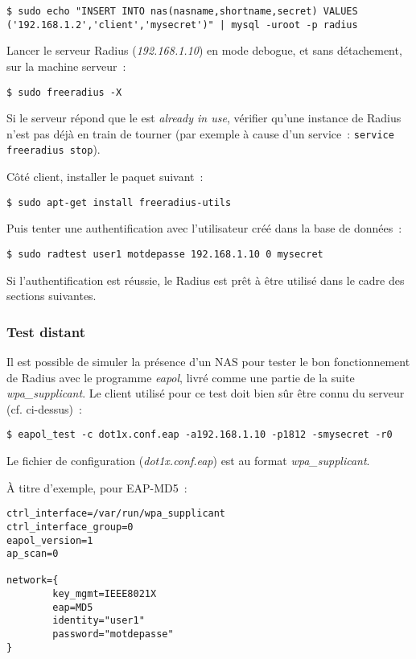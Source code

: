 \begin{lstlisting}
$ sudo echo "INSERT INTO nas(nasname,shortname,secret) VALUES ('192.168.1.2','client','mysecret')" | mysql -uroot -p radius
\end{lstlisting}

Lancer le serveur Radius (\emph{192.168.1.10}) en mode debogue, et sans détachement, sur la machine serveur~:

\begin{lstlisting}
$ sudo freeradius -X
\end{lstlisting}

Si le serveur répond que le est \emph{already in use}, vérifier qu'une instance de Radius n'est pas déjà en train de tourner (par exemple à cause d'un service~: \texttt{service freeradius stop}).

Côté client, installer le paquet suivant~:

\begin{lstlisting}
$ sudo apt-get install freeradius-utils
\end{lstlisting}

Puis tenter une authentification avec l'utilisateur créé dans la base de données~:

\begin{lstlisting}
$ sudo radtest user1 motdepasse 192.168.1.10 0 mysecret
\end{lstlisting}

Si l'authentification est réussie, le Radius est prêt à être utilisé dans le cadre des sections suivantes.

\subsubsection{Test distant}

Il est possible de simuler la présence d'un NAS pour tester le bon fonctionnement de Radius avec le programme \emph{eapol}, livré comme une partie de la suite \emph{wpa\_supplicant}. Le client utilisé pour ce test doit bien sûr être connu du serveur (cf. ci-dessus)~:

\begin{lstlisting}
$ eapol_test -c dot1x.conf.eap -a192.168.1.10 -p1812 -smysecret -r0
\end{lstlisting} 

Le fichier de configuration (\emph{dot1x.conf.eap}) est au format \emph{wpa\_supplicant}.

À titre d'exemple, pour EAP-MD5~:

\begin{lstlisting}
ctrl_interface=/var/run/wpa_supplicant
ctrl_interface_group=0
eapol_version=1
ap_scan=0

network={
        key_mgmt=IEEE8021X
        eap=MD5
        identity="user1"
        password="motdepasse"
}
\end{lstlisting}
